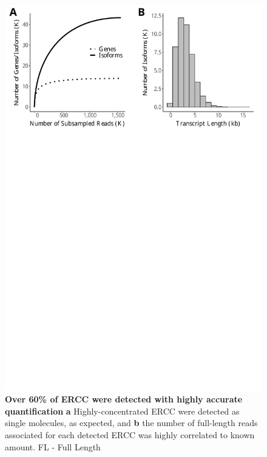 \begin{figure}[htp]
	\begin{center}
		\includegraphics[page=6,trim={0 25cm 0 0},clip,scale = 0.55]{Figures/IsoSeqWholeTranscriptome.pdf}
	\end{center}
	\captionsetup{width=0.95\textwidth}
	\caption[Detection of ERCC standards in Whole Transcriptome Iso-Seq]%
	{\textbf{Over 60\% of ERCC were detected with highly accurate quantification} \textbf{a} Highly-concentrated ERCC were detected as single molecules, as expected, and \textbf{b} the number of full-length reads associated for each detected ERCC was highly correlated to known amount. FL - Full Length}
	\label{fig:isoseq_whole_ercc}
\end{figure}


\newpage
